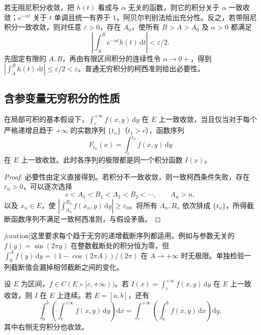 \documentclass[UTF8,12pt,a4paper,fontset=fandol]{ctexbook}
\begin{document}
\begin{solve}
若无阻尼积分收敛，把 $h(t)$ 看成与 $\alpha$ 无关的函数，则它的积分关于 $\alpha$ 一致收敛；$e^{-\alpha t}$ 关于 $t$ 单调且统一有界于 $1$，阿贝尔判别法给出充分性。反之，若带阻尼积分一致收敛，则对任意 $\varepsilon>0$，存在 $A_0$，使所有 $B>A>A_0$ 及 $\alpha>0$ 都满足
\[
    \left|\int_A^B e^{-\alpha t}h(t)\,\mathrm{d}t\right|<\varepsilon/2.
\]
先固定有限的 $A,B$，再由有限区间积分的连续性令 $\alpha\to0+$，得到 $|\int_A^B h(t)\,\mathrm{d}t|\leq\varepsilon/2<\varepsilon$。普通无穷积分的柯西准则给出必要性。
\end{solve}

\subsection{含参变量无穷积分的性质}
\label{subsec:properties-of-parameter-dependent-infinite-integrals}

\begin{theorem}[连续截断与序列截断的联系]
\label{thm:parameter-infinite-sequential-criterion}
在局部可积的基本假设下，$\int_c^{+\infty}f(x,y)\,\mathrm{d}y$ 在 $E$ 上一致收敛，当且仅当对于每个严格递增且趋于 $+\infty$ 的实数序列 $\{t_n\}$（$t_1>c$），函数序列
\[
    F_{t_n}(x)=\int_c^{t_n}f(x,y)\,\mathrm{d}y
\]
在 $E$ 上一致收敛。此时各序列的极限都是同一个积分函数 $I(x)$。
\end{theorem}

\begin{proof}
必要性由定义直接得到。若积分不一致收敛，则一致柯西条件失败，存在 $\varepsilon_0>0$，可以逐次选择
\[
    c<A_1<B_1<A_2<B_2<\cdots,\qquad A_n>n,
\]
以及 $x_n\in E$，使 $|\int_{A_n}^{B_n}f(x_n,y)\,\mathrm{d}y|\geq\varepsilon_0$。将所有 $A_n,B_n$ 依次排成 $\{t_n\}$，所得截断函数序列不满足一致柯西准则，与假设矛盾。
\end{proof}

\emph[caution]{这里要求每个趋于无穷的递增截断序列都适用。}例如与参数无关的 $f(y)=\sin(2\pi y)$ 在整数截断处的积分恒为零，但 $\int_0^A f(y)\,\mathrm{d}y=(1-\cos(2\pi A))/(2\pi)$ 在 $A\to+\infty$ 时无极限。单独检验一列截断值会漏掉相邻截断之间的变化。

\begin{theorem}[连续性与有限区间上的积分交换]
\label{thm:parameter-infinite-continuity-integration}
设 $E$ 为区间，$f\in C(E\times[c,+\infty))$。若 $I(x)=\int_c^{+\infty}f(x,y)\,\mathrm{d}y$ 在 $E$ 上一致收敛，则 $I$ 在 $E$ 上连续。若 $E=[a,b]$，还有
\begin{equation}
    \int_a^b\left(\int_c^{+\infty}f(x,y)\,\mathrm{d}y\right)\mathrm{d}x
    =\int_c^{+\infty}\left(\int_a^b f(x,y)\,\mathrm{d}x\right)\mathrm{d}y,
    \label{eq:parameter-infinite-integration-exchange}
\end{equation}
其中右侧无穷积分也收敛。
\end{theorem}
\end{document}
